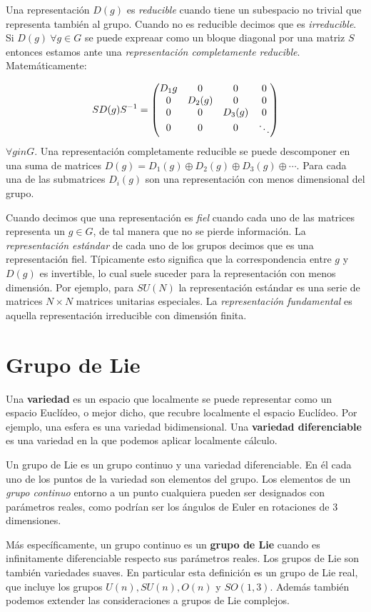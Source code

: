 Una representación $D(g)$ es \textit{reducible} cuando tiene un subespacio no trivial que representa también al grupo. Cuando no es reducible decimos que es \textit{irreducible}. Si $D(g) \ \forall g \in G$ se puede expreaar como un bloque diagonal por una matriz $S$ entonces estamos ante una \textit{representación completamente reducible}. Matemáticamente:

\begin{equation}
	SD(g)S^{-1} = \mqty(\dmat[0]{D_1{g},D_2(g),D_3(g),\ddots})
\end{equation}
$\forall g in G$. Una representación completamente reducible se puede descomponer en una suma de matrices $D(g)=D_1(g) \oplus D_2(g) \oplus D_3(g) \oplus \cdots$. Para cada una de las submatrices $D_i(g)$ son una representación con menos dimensional del grupo. 

Cuando decimos que una representación es \textit{fiel} cuando cada uno de las matrices representa un $g\in G$, de tal manera que no se pierde información. La \textit{representación estándar} de cada uno de los grupos decimos que es una representación fiel. Típicamente esto significa que la correspondencia entre $g$ y $D(g)$ es invertible, lo cual suele suceder para la representación con menos dimensión. Por ejemplo, para $SU(N)$ la representación estándar es una serie de matrices $N\times N$ matrices unitarias especiales. La \textit{representación fundamental} es aquella representación irreducible con dimensión finita. 

\section{Grupo de Lie}

Una \textbf{variedad} es un espacio que localmente se puede representar como un espacio Euclídeo, o mejor dicho, que recubre localmente el espacio Euclídeo. Por ejemplo, una esfera es una variedad bidimensional. Una \textbf{variedad diferenciable} es una variedad en la que podemos aplicar localmente cálculo. 

Un grupo de Lie es un grupo continuo y una variedad diferenciable. En él cada uno de los puntos de la variedad son elementos del grupo. Los elementos de un \textit{grupo continuo} entorno a un punto cualquiera pueden ser designados con parámetros reales, como podrían ser los ángulos de Euler en rotaciones de 3 dimensiones. 

Más específicamente, un grupo continuo es un \textbf{grupo de Lie} cuando es infinitamente diferenciable respecto sus parámetros reales. Los grupos de Lie son también variedades suaves. En particular esta definición es un grupo de Lie real, que incluye los grupos $U(n),SU(n),O(n)$ y $SO(1,3)$. Además también podemos extender las consideraciones a grupos de Lie complejos. 

